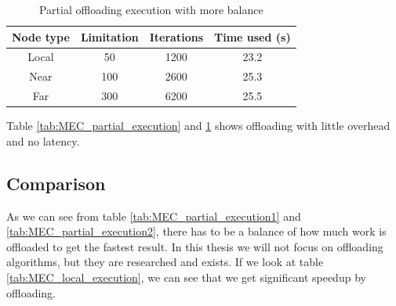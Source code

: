 \begin{table}[h!]
    \centering
    \begin{tabular}[c]{|c|c|c|c|}
        \hline
        Node type & Limitation & Iterations & Time used (s)\\
        \hline
        \hline
        Local & 50 & 1200 & 23.2 \\
        \hline
        Near & 100 & 2600 & 25.3 \\
        \hline
        Far & 300 & 6200 & 25.5 \\
        \hline
    \end{tabular}
    \caption{Partial offloading execution with more balance}
    \label{tab:MEC_partial_execution_balanced}
\end{table}
Table \ref{tab:MEC_partial_execution} and \ref{tab:MEC_partial_execution_balanced} shows offloading with little overhead and no latency.






\subsection{Comparison}
As we can see from table \ref{tab:MEC_partial_execution1} and \ref{tab:MEC_partial_execution2}, there has to be a balance of how much work is offloaded to get the fastest result. In this thesis we will not focus on offloading algorithms, but they are researched and exists. If we look at table \ref{tab:MEC_local_execution}, we can see that we get significant speedup by offloading.  %






